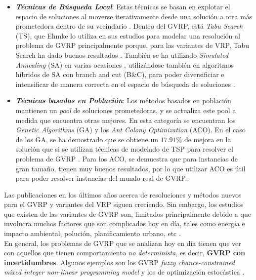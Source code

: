 \documentclass[letter, 10pt]{article}
\begin{document}
\begin{itemize}
    \item \textbf{\emph{Técnicas de Búsqueda Local}}: Estas técnicas se basan en explotar el espacio de soluciones al moverse iterativamente desde una solución a otra más prometedora dentro de su vecindario \cite{LIN20141118}. Dentro del GVRP, está \emph{Tabu Search} (TS), que Ehmke lo utiliza en sus estudios para modelar una resolución al problema de GVRP principalmente porque, para las variantes de VRP, Tabu Search ha dado buenos resultados \cite{EHMKE}. También se ha utilizado \emph{Simulated Annealing} (SA) en varias ocasiones \cite{SALOCAL}, utilizándose también en algoritmos híbridos de SA con branch and cut  (B\&C), para poder diversificiar e intensificar de manera correcta en el espacio de búsqueda de soluciones \cite{BYCSA}.
    
    \item \textbf{\emph{Técnicas basadas en Población}}: Los métodos basados en población mantienen un \emph{pool} de soluciones prometedoras, y se actualiza este pool a medida que encuentra otras mejores. En esta categoría se encuentran los \emph{Genetic Algorithms} (GA) y los \emph{Ant Colony Optimization} (ACO). En el caso de los GA, se ha demostrado que se obtiene un $17.91\%$ de mejora en la solución que si se utilizan técnicas de modelado de TSP para resolver el problema de GVRP \cite{GENETIC}. Para los ACO, se demuestra que para instancias de gran tamaño, tienen muy buenos resultados, por lo que utilizar ACO es útil para poder resolver instancias del mundo real de GVRP.\cite{ACO}.   
\end{itemize}

Las publicaciones en los últimos años acerca de resoluciones y métodos nuevos para el GVRP y variantes del VRP siguen creciendo. Sin embargo, los estudios que existen de las variantes de GVRP son, limitados principalmente debido a que involucra muchos factores que son complicados hoy en día, tales como energía e impacto ambiental, polución, planificamiento urbano, etc \cite{SYSTEMATICLITERATURE}.
\\

En general, los problemas de GVRP que se analizan hoy en día tienen que ver con aquellos que tienen comportamiento \emph{no determinista}, es decir, \textbf{GVRP con incertidumbres}. Algunos ejemplos son los GVRP \emph{fuzzy chance-constrained mixed integer non-linear programming model} \cite{Sun2018ATF} y los de optimización estocástica \cite{RAHIMI201759}. 
\end{document}
